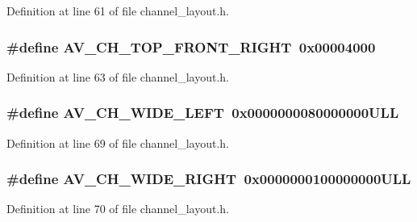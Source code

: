 Definition at line 61 of file channel\+\_\+layout.\+h.

\subsubsection[{\texorpdfstring{A\+V\+\_\+\+C\+H\+\_\+\+T\+O\+P\+\_\+\+F\+R\+O\+N\+T\+\_\+\+R\+I\+G\+HT}{AV_CH_TOP_FRONT_RIGHT}}]{\setlength{\rightskip}{0pt plus 5cm}\#define A\+V\+\_\+\+C\+H\+\_\+\+T\+O\+P\+\_\+\+F\+R\+O\+N\+T\+\_\+\+R\+I\+G\+HT~0x00004000}\hypertarget{group__channel__masks_gabce29ea1d7e2d433263b2cbf28232360}{}\label{group__channel__masks_gabce29ea1d7e2d433263b2cbf28232360}


Definition at line 63 of file channel\+\_\+layout.\+h.

\subsubsection[{\texorpdfstring{A\+V\+\_\+\+C\+H\+\_\+\+W\+I\+D\+E\+\_\+\+L\+E\+FT}{AV_CH_WIDE_LEFT}}]{\setlength{\rightskip}{0pt plus 5cm}\#define A\+V\+\_\+\+C\+H\+\_\+\+W\+I\+D\+E\+\_\+\+L\+E\+FT~0x0000000080000000\+U\+LL}\hypertarget{group__channel__masks_ga11e273c4872335063b5059cca52218c0}{}\label{group__channel__masks_ga11e273c4872335063b5059cca52218c0}


Definition at line 69 of file channel\+\_\+layout.\+h.

\subsubsection[{\texorpdfstring{A\+V\+\_\+\+C\+H\+\_\+\+W\+I\+D\+E\+\_\+\+R\+I\+G\+HT}{AV_CH_WIDE_RIGHT}}]{\setlength{\rightskip}{0pt plus 5cm}\#define A\+V\+\_\+\+C\+H\+\_\+\+W\+I\+D\+E\+\_\+\+R\+I\+G\+HT~0x0000000100000000\+U\+LL}\hypertarget{group__channel__masks_ga2c7ff738c3481d2891d052f5bca55248}{}\label{group__channel__masks_ga2c7ff738c3481d2891d052f5bca55248}


Definition at line 70 of file channel\+\_\+layout.\+h.

